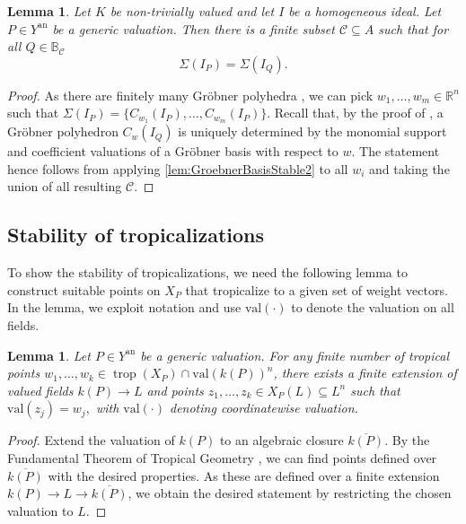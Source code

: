 \documentclass[12pt,reqno,a4paper]{amsart}
\theoremstyle{theoremstyle}
\newtheorem{lemma}[theorem]{Lemma}
\theoremstyle{examplestyle}
\theoremstyle{algorithmstyle}
\newcommand{\RR}{\mathbb{R}}
\newcommand{\an}{{\mathrm{an}}}
\DeclareMathOperator{\trop}{trop}
\begin{document}
\begin{lemma}\label{lem:GroebnerComplexStable2}
  Let $K$ be non-trivially valued and let $I$ be a homogeneous ideal. Let $P\in{Y^{\mathrm{an}}}$ be a generic valuation. Then there is a finite subset $\mathcal{C}\subseteq A$ such that for all $Q\in \mathbb{B}_{\mathcal{C}}$
  \begin{equation*}
    \Sigma(I_{P})=\Sigma(I_{Q}).
  \end{equation*}
\end{lemma}
\begin{proof}
  As there are finitely many Gr\"obner polyhedra \cite[Theorem 2.5.3]{MS15}, we can pick $w_1,\dots,w_m\in \RR^n$ such that $\Sigma(I_P)=\{C_{w_1}(I_P),\dots,C_{w_m}(I_P)\}$.
  Recall that, by the proof of \cite[Proposition 2.5.2]{MS15}, a Gr\"obner polyhedron $C_w(I_Q)$ is uniquely determined by the monomial support and coefficient valuations of a Gr\"obner basis with respect to $w$.
  The statement hence follows from applying \cref{lem:GroebnerBasisStable2} to all $w_i$ and taking the union of all resulting $\mathcal C$.
\end{proof}

\subsection*{Stability of tropicalizations}
To show the stability of tropicalizations, we need the following lemma to construct suitable points on $X_{P}$ that tropicalize to a given set of weight vectors.  In the lemma, we exploit notation and use $\textrm{val}(\cdot)$ to denote the valuation on all fields.

\begin{lemma}\label{lem:ExtendValuationPoints}
  Let $P\in Y^{\an}$ be a generic valuation. For any finite number of tropical points $w_{1},\dots, w_{k}\in\trop(X_{P})\cap \mathrm{val}(k(P))^n$, there exists a finite extension of valued fields $k(P)\to L$ and points $z_1,\dots,z_k\in X_{P}(L)\subseteq L^n$ such that
  \begin{math}
    \mathrm{val}(z_{j})=w_{j},
  \end{math}
  with $\mathrm{val}(\cdot)$ denoting coordinatewise valuation.
\end{lemma}
\begin{proof}
  Extend the valuation of $k(P)$ to an algebraic closure $\overline{k(P)}$. By the Fundamental Theorem of Tropical Geometry \cite[Theorem 3.2.3]{MS15}, we can find points defined over $\overline{k(P)}$ with the desired properties. As these are defined over a finite extension $k(P)\to L\to \overline{k(P)}$, we obtain the desired statement by restricting the chosen valuation to $L$.
\end{proof}
\end{document}
